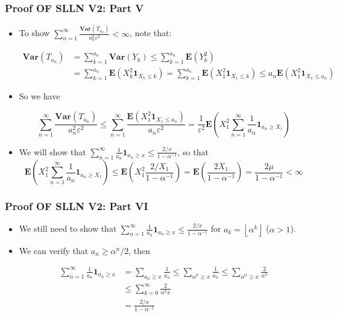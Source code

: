 \documentclass[handout]{beamer}
\newcommand{\BE}{\mathbf{E}}
\newcommand{\BI}{\mathbf{1}}
\newcommand{\BV}{\mathbf{Var}}
\begin{document}
\frame
{
  \frametitle{Proof OF SLLN V2: Part V}

   \begin{itemize}
   \item<1-> To show $\sum_{n=1}^{\infty}\frac{\BV(T_{a_n})}{a_n^2 \varepsilon^2}<\infty$,  note that:
   
   \begin{align*} \BV(T_{a_n})& =\sum_{k=1}^{a_n} \BV(Y_k) \leq \sum_{k=1}^{a_n} \BE(Y_k^2) \\ & = \sum_{k=1}^{a_n} \BE(X_k^2 \BI_{X_k\leq k})= \sum_{k=1}^{a_n} \BE(X_1^2 \BI_{X_1\leq k}) \leq a_n \BE(X_1^2 \BI_{X_1\leq a_n} ) \end {align*} 
       
        
    \item<2->[-] So we have 
    
    $$\sum_{n=1}^{\infty}\frac{\BV(T_{a_n})}{a_n^2 \varepsilon^2}\leq \sum_{n=1}^{\infty} \frac{ \BE(X_1^2 \BI_{X_1\leq a_n} )}{a_n \varepsilon^2} = \frac{1}{\varepsilon^2} \BE(X_1^2 \sum_{n=1}^{\infty} \frac{1}{a_n}  \BI_{a_n\geq X_1} )$$
    
    
        
        \item<3->[-] We will show that $\sum_{n=1}^{\infty} \frac{1}{a_n}  \BI_{a_n\geq x} \leq \frac{2/x}{1-\alpha^{-1}}$, so that 
        $$\BE(X_1^2 \sum_{n=1}^{\infty} \frac{1}{a_n}  \BI_{a_n\geq X_1} )\leq \BE(X_1^2  \frac{2/X_1}{1-\alpha^{-1}} )=\BE(\frac{2X_1}{1-\alpha^{-1}})=\frac{2\mu}{1-\alpha^{-1}}<\infty$$
        
                                                        
\end{itemize}
}



\frame
{
  \frametitle{Proof OF SLLN V2: Part VI}

   \begin{itemize}
   \item<1-> We still need to show that $\sum_{n=1}^{\infty} \frac{1}{a_n}  \BI_{a_n\geq x} \leq \frac{2/x}{1-\alpha^{-1}}$ for $a_k=\left \lfloor{\alpha^k}\right \rfloor$ ($\alpha>1$). 
     
     \item<2-> We can verify that $a_n\geq \alpha^n/2$, then 
     
     \begin{align*}
     \sum_{n=1}^{\infty} \frac{1}{a_n}\BI_{a_n\geq x} &  =\sum_{a_n\geq x} \frac{1}{a_n} \leq \sum_{\alpha^n \geq x} \frac{1}{a_n}  \leq \sum_{\alpha^n \geq x} \frac{2}{\alpha^n } \\ 
     & \le \sum_{k=0}^{\infty} \frac{2}{\alpha^{k}x } \\
     &=\frac{2/x}{ 1-\alpha^{-1}} 
     \end{align*}
                                                               
\end{itemize}
}
\end{document}
